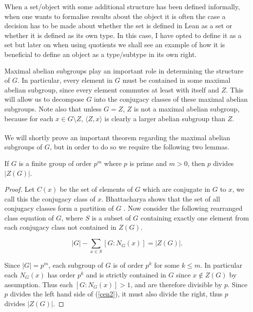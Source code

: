 \begin{remark}
  When a set/object with some additional structure has been defined informally, when one wants to formalise results about the object it is often the case a decision has to be made
  about whether the set is defined in Lean as a set or whether it is defined as its own type. In this case, I have opted to define it as a set but later on when using quotients we shall see an example
  of how it is beneficial to define an object as a type/subtype in its own right.
\end{remark}

\vspace{3mm}

Maximal abelian subgroups play an important role in determining the structure of $G$. In particular, every element in $G$ must be contained in some maximal abelian subgroup, since every element commutes at least with itself and $Z$. This will allow us to decompose $G$ into the conjugacy classes of these maximal abelian subgroups. Note also that unless $G=Z$, $Z$ is not a maximal abelian subgroup, because for each $x \in G \! \setminus \! Z$, $\langle Z,x \rangle$ is clearly a larger abelian subgroup than $Z$. \\
\\
We will shortly prove an important theorem regarding the maximal abelian subgroups of $G$, but in order to do so we require the following two lemmas. \\

\begin{lemma}
  \label{IsElementaryAbelian.dvd_card}
  \leanok
If $G$ is a finite group of order $p^m$ where $p$ is prime and $m > 0$, then $p$ divides $|Z(G)|$. 
\end{lemma}

\begin{proof}
Let $C(x)$ be the set of elements of $G$ which are conjugate in $G$ to $x$, we call this the conjugacy class of $x$. Bhattacharya shows that the set of all conjugacy classes form a partition of $G$ \cite[p.112]{bhattacharya}. Now consider the following rearranged class equation of $G$, where $S$ is a subset of $G$ containing exactly one element from each conjugacy class not contained in $Z(G)$. 
 
\begin{equation} \label{cen2}
|G| - \sum_{x \in S} [G:N_G(x)] = |Z(G)|.
\end{equation}

Since $|G| = p^m$, each subgroup of $G$ is of order $p^k$ for some $k \leq m$. In particular each $N_G(x)$ has order $p^k$ and is strictly contained in $G$ since $x \not \in Z(G)$ by assumption. Thus each $[G:N_G(x)] > 1$, and are therefore divisible by $p$. Since $p$ divides the left hand side of (\ref{cen2}), it must also divide the right, thus $p$ divides $|Z(G)|$. 

\end{proof}



